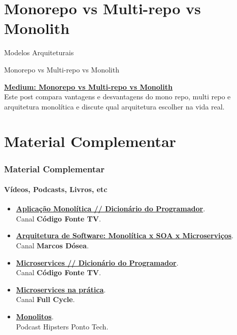 \documentclass[
	10pt, %
	t, %
]{beamer}
\newcommand{\iconLink}[2]{\href{#1}{\faLink \hspace{0.2em} {#2}}}
\begin{document}

\section{Monorepo vs Multi-repo vs Monolith}

\begin{frame}
	\begin{center}
		
		\bigskip\bigskip\bigskip\bigskip %
		{\Large Modelos Arquiteturais}
		
		\bigskip\bigskip %
		{\Huge Monorepo vs Multi-repo vs Monolith}
		
		\smallskip
		{\small \iconLink{https://medium.com/@magenta2127/monorepo-vs-multi-repo-vs-monolith-7c4a5f476009}{\textbf{Medium: Monorepo vs Multi-repo vs Monolith}}}\\
		\bigskip
		{\small Este post compara vantagens e desvantagens do mono repo, multi repo e arquitetura monolítica e discute qual arquitetura escolher na vida real.}
	\end{center}

\end{frame}

\section{Material Complementar}

\begin{frame}
	\frametitle{Material Complementar}
	\framesubtitle{Vídeos, Podcasts, Livros, etc}
	
	\begin{itemize}
		\item \href{https://youtu.be/CsrHHHPHKwE}{\textbf{Aplicação Monolítica // Dicionário do Programador}}.\\Canal \textbf{Código Fonte TV}.
		\item \href{https://youtu.be/suZfVAk7hco}{\textbf{Arquitetura de Software: Monolítica x SOA x Microserviços}}.\\Canal \textbf{Marcos Dósea}.
		\item \href{https://www.youtube.com/watch?v=_2bDOCTnbKc}{\textbf{Microservices // Dicionário do Programador}}.\\Canal \textbf{Código Fonte TV}.
		\item \href{https://youtu.be/gtv9szE_P1U}{\textbf{Microservices na prática}}.\\Canal \textbf{Full Cycle}.
		\item \href{https://www.hipsters.tech/uma-linguagem-para-cada-combate-hipsters-ponto-tech-277}{\textbf{Monolitos}}.\\Podcast Hipsters Ponto Tech.
	\end{itemize}
	
\end{frame}
\end{document}
